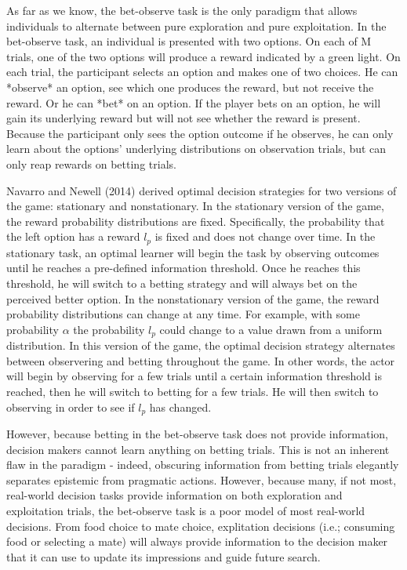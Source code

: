 \documentclass[a4paper,doc,natbib,floatsintext]{apa6}\usepackage[]{graphicx}\usepackage[]{color}
\begin{document}
As far as we know, the bet-observe task is the only paradigm that allows individuals to alternate between pure exploration and pure exploitation. In the bet-observe task, an individual is presented with two options. On each of M trials, one of the two options will produce a reward indicated by a green light. On each trial, the participant selects an option and makes one of two choices. He can *observe* an option, see which one produces the reward, but not receive the reward. Or he can *bet* on an option. If the player bets on an option, he will gain its underlying reward but will not see whether the reward is present. Because the participant only sees the option outcome if he observes, he can only learn about the options' underlying distributions on observation trials, but can only reap rewards on betting trials.

Navarro and Newell (2014) derived optimal decision strategies for two versions of the game: stationary and nonstationary. In the stationary version of the game, the reward probability distributions are fixed. Specifically, the probability that the left option has a reward $l_{p}$ is fixed and does not change over time. In the stationary task, an optimal learner will begin the task by observing outcomes until he reaches a pre-defined information threshold. Once he reaches this threshold, he will switch to a betting strategy and will always bet on the perceived better option. In the nonstationary version of the game, the reward probability distributions can change at any time. For example, with some probability $\alpha$ the probability $l_{p}$ could change to a value drawn from a uniform distribution. In this version of the game, the optimal decision strategy alternates between observering and betting throughout the game. In other words, the actor will begin by observing for a few trials until a certain information threshold is reached, then he will switch to betting for a few trials. He will then switch to observing in order to see if $l_{p}$ has changed.

However, because betting in the bet-observe task does not provide information, decision makers cannot learn anything on betting trials. This is not an inherent flaw in the paradigm - indeed, obscuring information from betting trials elegantly separates epistemic from pragmatic actions. However, because many, if not most, real-world decision tasks provide information on both exploration and exploitation trials, the bet-observe task is a poor model of most real-world decisions. From food choice to mate choice, explitation decisions (i.e.; consuming food or selecting a mate) will always provide information to the decision maker that it can use to update its impressions and guide future search. 
\end{document}

